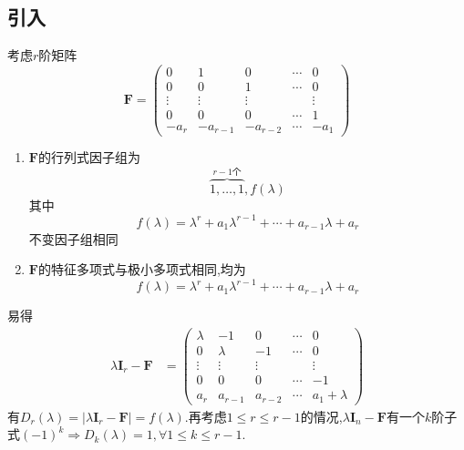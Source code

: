 \subsection{引入}
\begin{green}
\begin{lemma}[友阵]\label{lemma:友阵}
    考虑$r$阶矩阵\[
    \bm{F}=\begin{pmatrix}
        0&1&0&\cdots&0\\
        0&0&1&\cdots&0\\
        \vdots&\vdots&\vdots&&\vdots\\
        0&0&0&\cdots&1\\
        -a_r&-a_{r-1}&-a_{r-2}&\cdots&-a_1
    \end{pmatrix}
    \]\begin{enumerate}[label={\textup{(\arabic*)}}]
        \item $\bm{F}$的行列式因子组为\[
        \overbrace{1, \ldots, 1}^{r-1 \text{个}}, f\left(\lambda\right)
        \]其中\[
        f\left(\lambda\right)=\lambda^r+a_1\lambda^{r-1}+\cdots+a_{r-1}\lambda+a_r
        \]不变因子组相同
        \item $\bm{F}$的特征多项式与极小多项式相同,均为
        \[
f\left(\lambda\right)=\lambda^r+a_1\lambda^{r-1}+\cdots+a_{r-1}\lambda+a_r
\]
    \end{enumerate}
\end{lemma}
\begin{Proof}
易得
\begin{align*}
    \lambda\bm{I}_r-\bm{F}&=\begin{pmatrix}
        \lambda&-1&0&\cdots&0\\
        0&\lambda&-1&\cdots&0\\
        \vdots&\vdots&\vdots&&\vdots\\
        0&0&0&\cdots&-1\\
        a_r&a_{r-1}&a_{r-2}&\cdots&a_1+\lambda
    \end{pmatrix}
\end{align*}
有$D_r\left(\lambda\right)=\left|
\lambda\bm{I}_r-\bm{F}
\right|=f\left(\lambda\right).$再考虑$1\leqslant r\leqslant r-1$的情况,$\lambda\bm{I}_n-\bm{F}$有一个$k$阶子式$\left(-1\right)^k\Longrightarrow D_k\left(\lambda\right)=1,\forall 1\leqslant k\leqslant r-1$.


\end{Proof}
\end{green}
